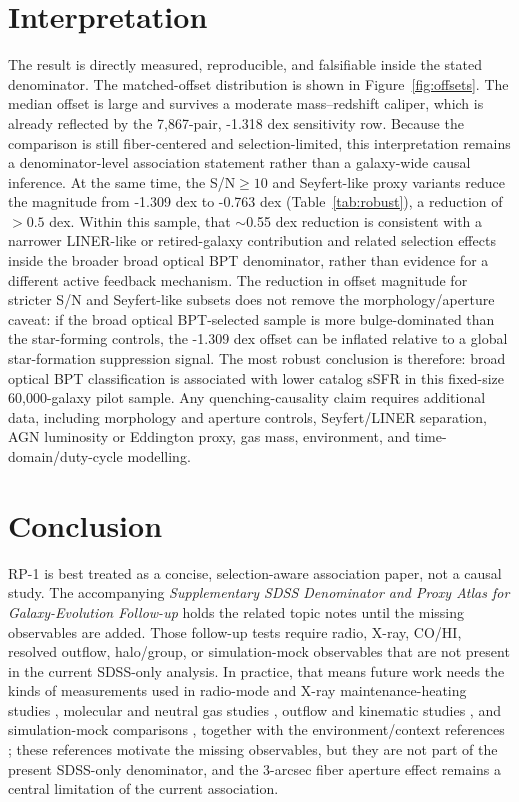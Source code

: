 \documentclass[twocolumn]{aastex631}
\begin{document}
\section{Interpretation}
The result is directly measured, reproducible, and falsifiable inside the stated denominator. The matched-offset distribution is shown in Figure~\ref{fig:offsets}. The median offset is large and survives a moderate mass--redshift caliper, which is already reflected by the 7,867-pair, -1.318 dex sensitivity row.
Because the comparison is still fiber-centered and selection-limited, this interpretation remains a denominator-level association statement rather than a galaxy-wide causal inference. At the same time, the S/N$\geq10$ and Seyfert-like proxy variants reduce the magnitude from -1.309 dex to -0.763 dex (Table~\ref{tab:robust}), a reduction of $>0.5$ dex. Within this sample, that $\sim$0.55 dex reduction is consistent with a narrower LINER-like or retired-galaxy contribution and related selection effects inside the broader broad optical BPT denominator, rather than evidence for a different active feedback mechanism. The reduction in offset magnitude for stricter S/N and Seyfert-like subsets does not remove the morphology/aperture caveat: if the broad optical BPT-selected sample is more bulge-dominated than the star-forming controls, the -1.309 dex offset can be inflated relative to a global star-formation suppression signal. The most robust conclusion is therefore: broad optical BPT classification is associated with lower catalog sSFR in this fixed-size 60,000-galaxy pilot sample. Any quenching-causality claim requires additional data, including morphology and aperture controls, Seyfert/LINER separation, AGN luminosity or Eddington proxy, gas mass, environment, and time-domain/duty-cycle modelling.

\section{Conclusion}
RP-1 is best treated as a concise, selection-aware association paper, not a causal study. The accompanying \emph{Supplementary SDSS Denominator and Proxy Atlas for Galaxy-Evolution Follow-up} holds the related topic notes until the missing observables are added. Those follow-up tests require radio, X-ray, CO/HI, resolved outflow, halo/group, or simulation-mock observables that are not present in the current SDSS-only analysis.
In practice, that means future work needs the kinds of measurements used in radio-mode and X-ray maintenance-heating studies \citep{best2005,fabian2012,mcnamara2007,heckmanbest2014,lamassa2013}, molecular and neutral gas studies \citep{xcoldgass2017,xgass2018}, outflow and kinematic studies \citep{veilleux2005,cicone2014,carniani2017,fiore2017}, and simulation-mock comparisons \citep{simba2019,tng2019,eagle2015}, together with the environment/context references \citep{peng2010,piotrowska2022,wetzel2013,dekel2006}; these references motivate the missing observables, but they are not part of the present SDSS-only denominator, and the 3-arcsec fiber aperture effect remains a central limitation of the current association.
\end{document}

